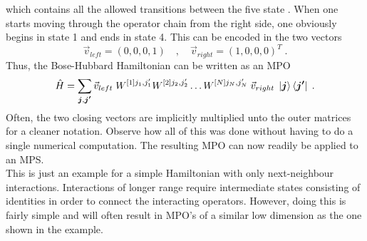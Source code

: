 which contains all the allowed transitions between the five state \cite{Schollwock}. When one starts moving through the operator chain from the right side, one obviously begins in state 1 and ends in state 4. This can be encoded in the two vectors
\begin{equation*}
 \vec{v}_{left} = (0 , 0 , 0  , 1) \quad , \quad \vec{v}_{right} = (1  , 0 ,0 , 0)^T \; .
\end{equation*}
Thus, the Bose-Hubbard Hamiltonian can be written as an MPO 
\begin{equation}
	\hat{H} = \sum_{\boldsymbol{j}, \boldsymbol{j'}} \vec{v}_{left} \; W^{[1] j_1 , j_1 '} W^{[2] j_2 , j_2 '} \ldots W^{[N] j_N , j_N '} \; \vec{v}_{right} \; \ket{\boldsymbol{j}} \bra{\boldsymbol{j'}} \; .
	\label{eq:MPOhamiltonian}
\end{equation}
Often, the two closing vectors are implicitly multiplied unto the outer matrices for a cleaner notation. Observe how all of this was done without having to do a single numerical computation. The resulting MPO can now readily be applied to an MPS.\\

This is just an example for a simple Hamiltonian with only next-neighbour interactions. Interactions of longer range require intermediate states consisting of identities in order to connect the interacting operators. However, doing this is fairly simple and will often result in MPO's of a similar low dimension as the one shown in the example.


